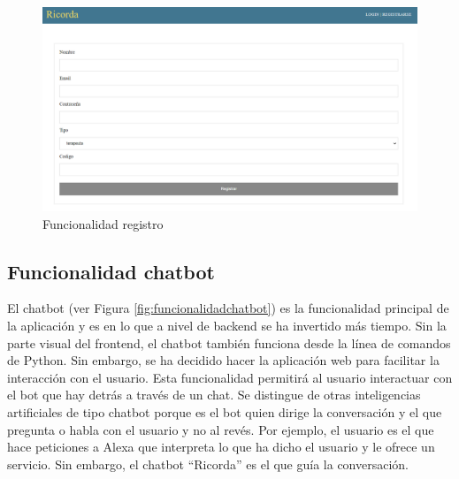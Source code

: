 \begin{figure}[h]
	\centering
	\includegraphics[scale=0.5]{Imagenes/Vectorial/funcionalidad_signin}
	\caption{Funcionalidad registro}
	\label{fig:funcionalidadsignin}
\end{figure}

\subsection{Funcionalidad chatbot}

El chatbot (ver Figura \ref{fig:funcionalidadchatbot}) es la funcionalidad principal de la aplicación y es en lo que a nivel de backend se ha invertido más tiempo. Sin la parte visual del frontend, el chatbot también funciona desde la línea de comandos de Python. Sin embargo, se ha decidido hacer la aplicación web para facilitar la interacción con el usuario. Esta funcionalidad permitirá al usuario interactuar con el bot que hay detrás a través de un chat. Se distingue de otras inteligencias artificiales de tipo chatbot porque es el bot quien dirige la conversación y el que pregunta o habla con el usuario y no al revés. Por ejemplo, el usuario es el que hace peticiones a Alexa que interpreta lo que ha dicho el usuario y le ofrece un servicio. Sin embargo, el chatbot ``Ricorda'' es el que guía la conversación.

